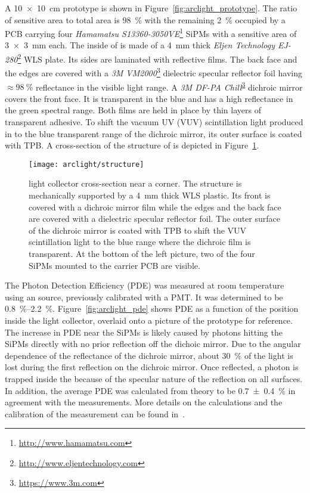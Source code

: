 A \SI{10 x 10}{\centi\metre} \AL{} prototype is shown in Figure~\ref{fig:arclight_prototype}.
The ratio of sensitive area to total area is \SI{98}{\percent} with the remaining \SI{2}{\percent} occupied by a PCB carrying four \emph{Hamamatsu S13360-3050VE}\footnote{\url{http://www.hamamatsu.com}} SiPMs with a sensitive area of \SI{3 x 3}{\milli\metre} each.
The inside of \AL{} is made of a \SI{4}{\milli\metre} thick \emph{Eljen Technology EJ-280}\footnote{\url{http://www.eljentechnology.com}} WLS plate.
Its sides are laminated with reflective films.
The back face and the edges are covered with a \emph{3M VM2000}\footnote{\url{https://www.3m.com}\label{foot:3M}} dielectric specular reflector foil having $\approx \SI{98}{\percent}$ reflectance in the visible light range.
A \emph{3M DF-PA Chill}\textsuperscript{\ref{foot:3M}} dichroic mirror covers the front face.
It is transparent in the blue and has a high reflectance in the green spectral range.
Both films are held in place by thin layers of transparent adhesive.
To shift the vacuum UV (VUV) scintillation light produced in \lar{} to the blue transparent range of the dichroic mirror, its outer surface is coated with TPB.
A cross-section of the structure of \AL{} is depicted in Figure~\ref{fig:arclight_structure}.

\begin{figure}[htb]
	\centering
	\texttt{[image: arclight/structure]}
	\caption{\AL{} light collector cross-section near a corner.
		The structure is mechanically supported by a \SI{4}{\milli\metre} thick WLS plastic.
		Its front is covered with a dichroic mirror film while the edges and the back face are covered with a dielectric specular reflector foil.
		The outer surface of the dichroic mirror is coated with TPB to shift the \lar{} VUV scintillation light to the blue range where the dichroic film is transparent.
		At the bottom of the left picture, two of the four SiPMs mounted to the carrier PCB are visible.}
	\label{fig:arclight_structure}
\end{figure}

The Photon Detection Efficiency (PDE) was measured at room temperature using an  source, previously calibrated with a PMT.
It was determined to be \SIrange{0.8}{2.2}{\percent}.
Figure~\ref{fig:arclight_pde} shows PDE as a function of the position inside the light collector, overlaid onto a picture of the prototype for reference.
The increase in PDE near the SiPMs is likely caused by photons hitting the SiPMs directly with no prior reflection off the dichoic mirror.
Due to the angular dependence of the reflectance of the dichroic mirror, about \SI{30}{\percent} of the light is lost during the first reflection on the dichroic mirror.
Once reflected, a photon is trapped inside the \AL{} because of the specular nature of the reflection on all surfaces.
In addition, the average PDE was calculated from theory to be \SI{0.7 +- 0.4}{\percent} in agreement with the measurements.
More details on the calculations and the calibration of the measurement can be found in~\cite{arclight}.

